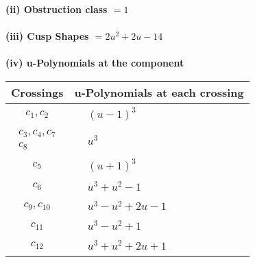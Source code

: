 \documentclass[1p]{elsarticle_modified}
\theoremstyle{definition}
\begin{document}
\flushleft \textbf{(ii) Obstruction class $= 1$}\\~\\
\flushleft \textbf{(iii) Cusp Shapes $= 2 u^2+2 u-14$}\\~\\
\newpage\renewcommand{\arraystretch}{1}
\flushleft \textbf{(iv) u-Polynomials at the component}\newline \\
\begin{tabular}{m{50pt}|m{274pt}}
Crossings & \hspace{64pt}u-Polynomials at each crossing \\
\hline $$\begin{aligned}c_{1},c_{2}\end{aligned}$$&$\begin{aligned}
&(u-1)^3
\end{aligned}$\\
\hline $$\begin{aligned}c_{3},c_{4},c_{7}\\c_{8}\end{aligned}$$&$\begin{aligned}
&u^3
\end{aligned}$\\
\hline $$\begin{aligned}c_{5}\end{aligned}$$&$\begin{aligned}
&(u+1)^3
\end{aligned}$\\
\hline $$\begin{aligned}c_{6}\end{aligned}$$&$\begin{aligned}
&u^3+u^2-1
\end{aligned}$\\
\hline $$\begin{aligned}c_{9},c_{10}\end{aligned}$$&$\begin{aligned}
&u^3- u^2+2 u-1
\end{aligned}$\\
\hline $$\begin{aligned}c_{11}\end{aligned}$$&$\begin{aligned}
&u^3- u^2+1
\end{aligned}$\\
\hline $$\begin{aligned}c_{12}\end{aligned}$$&$\begin{aligned}
&u^3+u^2+2 u+1
\end{aligned}$\\
\hline
\end{tabular}\\~\\
\end{document}

